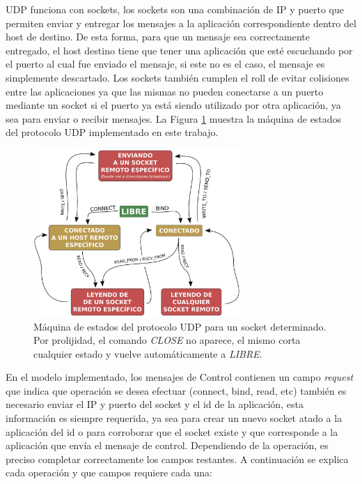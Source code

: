 \documentclass[10pt,a4paper]{article}
\begin{document}
UDP funciona con sockets, los sockets son una combinación de IP y puerto que permiten enviar y entregar los mensajes a la aplicación correspondiente dentro del host de destino. De esta forma, para que un mensaje sea correctamente entregado, el host destino tiene que tener una aplicación que esté escuchando por el puerto al cual fue enviado el mensaje, si este no es el caso, el mensaje es simplemente descartado. Los sockets también cumplen el roll de evitar colisiones entre las aplicaciones ya que las mismas no pueden conectarse a un puerto mediante un socket si el puerto ya está siendo utilizado por otra aplicación, ya sea para enviar o recibir mensajes. La Figura \ref{figure: UPD state machine} muestra la máquina de estados del protocolo UDP implementado en este trabajo. \\

\begin{figure}[t]
    \centering
    \includegraphics[width = 0.7\textwidth]{img/png/UDP-state-machine.png}
    \caption{Máquina de estados del protocolo UDP para un socket determinado. Por prolijidad, el comando \textit{CLOSE} no aparece, el mismo corta cualquier estado y vuelve automáticamente a \textit{LIBRE}.}
    \label{figure: UPD state machine}
\end{figure}

\newpage
 
En el modelo implementado, los mensajes de Control contienen un campo \textit{request} que indica que operación se desea efectuar (connect, bind, read, etc) también es necesario enviar el IP y puerto del socket y el id de la aplicación, esta información es siempre requerida, ya sea para crear un nuevo socket atado a la aplicación del id o para corroborar que el socket existe y que corresponde a la aplicación que envía el mensaje de control. Dependiendo de la operación, es preciso completar correctamente los campos restantes. A continuación se explica cada operación y que campos requiere cada una: \\
\end{document}
